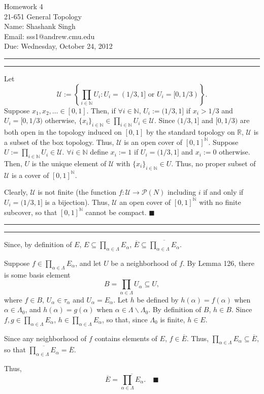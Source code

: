 \documentclass[11pt]{article}
\makeatletter
\newcounter{questionCounter}
\newcounter{partCounter}[questionCounter]
\newenvironment{question}[2][\arabic{questionCounter}]{%
    \setcounter{partCounter}{0}%
    \vspace{.25in} \hrule \vspace{0.5em}%
        \noindent{\bf #2}%
    \vspace{0.8em} \hrule \vspace{.10in}%
    \addtocounter{questionCounter}{1}%
}{}
\newcommand{\myname}{Shashank Singh}
\newcommand{\myandrew}{sss1@andrew.cmu.edu}
\newcommand{\myclass}{21-651 General Topology}
\newcommand{\myhwnum}{4}
\newcommand{\duedate}{Wednesday, October 24, 2012}
\renewcommand{\qed}{\quad $\blacksquare$}
\newcommand{\mqed}{\quad \blacksquare}
\newcommand{\sminus}{\backslash}
\newcommand{\N}{\mathbb{N}} %
\newcommand{\R}{\mathbb{R}} %
\newcommand{\pow}[1]{\mathcal{P}\left(#1\right)} %
\makeatother
\begin{document}
\thispagestyle{plain}

{\Large Homework \myhwnum} \\
\myclass \\
Name: \myname \\
Email: \myandrew \\
Due: \duedate \\
\begin{question}{Problem 1}
Let
\[\mathcal{U}
    := \left\{\prod_{i \in \N} U_i : U_i = (1/3,1] \mbox{ or } U_i = [0,1/3)\right\}.
\]
Suppose $x_1,x_2,\ldots \in [0,1]$. Then, if $\forall i \in \N$,
$U_i := (1/3,1]$ if $x_i > 1/3$ and $U_i = [0,1/3)$ otherwise,
$\{x_i\}_{i \in \N} \in \prod_{i \in \N} U_i \in \mathcal{U}$. Since
$(1/3,1]$ and $[0,1/3)$ are both open in the topology induced on $[0,1]$ by
the standard topology on $\R$, $\mathcal{U}$ is a subset of the box topology.
Thus, $\mathcal{U}$ is an open cover of $[0,1]^{\N}$.
Suppose $U := \prod_{i \in \N} U_i \in \mathcal{U}$. $\forall i \in \N$ define
$x_i := 1$ if $U_i = (1/3,1]$ and $x_i := 0$ otherwise. Then, $U$ is the
unique element of $\mathcal{U}$ with $\{x_i\}_{i \in \N} \in U$. Thus, no
proper subset of $\mathcal{U}$ is a cover of $[0,1]^{\N}$.

Clearly, $\mathcal{U}$ is not finite (the function
$f: \mathcal{U} \rightarrow \pow{N}$ including $i$ if and only if
$U_i = (1/3,1]$ is a bijection).
Thus, $\mathcal{U}$ an open cover of $[0,1]^{\N}$ with no finite
subcover, so that $[0,1]^{\N}$ cannot be compact. \qed
\end{question}

\begin{question}{Problem 2}
Since, by definition of $E$,
$\displaystyle
    E \subseteq \prod_{\alpha \in \Lambda} E_{\alpha}$,
$\displaystyle \overline{E}
    \subseteq \overline{\prod_{\alpha \in \Lambda} E_{\alpha}}$.

Suppose $f \in \prod_{\alpha \in \Lambda} E_{\alpha}$, and let $U$ be a
neighborhood of $f$. By Lemma 126, there is some basis element
\[B = \prod_{\alpha \in \Lambda} U_{\alpha} \subseteq U,\]
where $f \in B$, $U_{\alpha} \in \tau_{\alpha}$ and $U_{\alpha} = E_{\alpha}$.
Let $h$ be defined by $h(\alpha) = f(\alpha)$ when $\alpha \in \Lambda_0$, and
$h(\alpha) = g(\alpha)$ when $\alpha \in \Lambda \sminus \Lambda_0$. By
definition of $B$, $h \in B$. Since $f,g \in \prod_{\alpha \in \Lambda} E_{\alpha}$,
$h \in \prod_{\alpha \in \Lambda} E_{\alpha}$, so that, since $\Lambda_0$ is finite, $h \in E$.

Since any neighborhood of $f$ contains elements of $E$, $f \in \overline{E}$.
Thus,
$\displaystyle \prod_{\alpha \in \Lambda} E_{\alpha} \subseteq \overline{E}$,
so that
$\displaystyle \overline{\prod_{\alpha \in \Lambda} E_{\alpha}}
    =         \overline{E}$.

Thus,
\[\overline{E} = \overline{\prod_{\alpha \in \Lambda} E_{\alpha}}.\mqed\]
\end{question}
\end{document}

